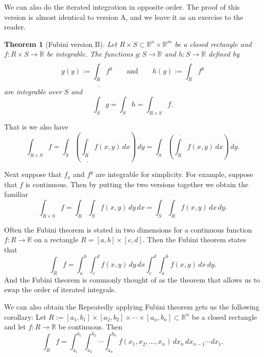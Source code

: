 \documentclass[12pt]{book}
\newcommand{\R}{{\mathbb{R}}}
\theoremstyle{plain}
\newtheorem{thm}{Theorem}[section]
\theoremstyle{remark}
\theoremstyle{definition}
\theoremstyle{exercise}
\theoremstyle{example}
\begin{document}
We can also do the iterated integration in opposite order.
The proof of this version is almost identical to version A, and
we leave it as an exercise to the reader.

\begin{thm}[Fubini version B]\label{mv:fubinivB}
Let $R \times S \subset \R^n \times \R^m$ be a closed rectangle and
$f \colon R \times S \to \R$ be integrable.
The functions $g \colon S \to \R$ and $h \colon S \to \R$ defined by
\begin{equation*}
g(y) := \underline{\int_R} f^y \qquad
\text{and} \qquad
h(y) := \overline{\int_R} f^y 
\end{equation*}
are integrable over $S$ and
\begin{equation*}
\int_S g = \int_S h = \int_{R \times S} f .
\end{equation*}
\end{thm}

That is we also have
\begin{equation*}
\int_{R \times S} f
=
 \int_S \left(
 \underline{\int_R} f(x,y) \, dx
\right) \, dy
=
 \int_S \left(
 \overline{\int_R} f(x,y) \, dx
\right) \, dy .
\end{equation*}

Next suppose that $f_x$ and $f^y$ are integrable for simplicity.
For example, suppose that $f$ is continuous.  Then by
putting the two versions together we obtain the familiar
\begin{equation*}
\int_{R \times S} f
=
 \int_R 
 \int_S f(x,y) \, dy \, dx 
=
 \int_S 
 \int_R f(x,y) \, dx \, dy .
\end{equation*}

Often the Fubini theorem is stated in two dimensions
for a continuous function $f \colon R \to
\R$ on a rectangle $R = [a,b] \times [c,d]$.  Then the Fubini theorem
states that
\begin{equation*}
\int_R f = \int_a^b \int_c^d f(x,y) \,dy\,dx
\int_c^d \int_a^b f(x,y) \,dx\,dy .
\end{equation*}
And the Fubini theorem is commonly thought of as the theorem that allows us
to swap the order of iterated integrals.

We can also obtain the 
Repeatedly applying Fubini theorem gets us the following
corollary:
Let $R := [a_1,b_1] \times [a_2,b_2] \times \cdots \times [a_n,b_n] \subset
\R^n$ be a closed rectangle and let
$f \colon R \to \R$ be continuous.  Then
\begin{equation*}
\int_R f = 
\int_{a_1}^{b_1}
\int_{a_2}^{b_2}
\cdots
\int_{a_n}^{b_n}
f(x_1,x_2,\ldots,x_n)
\,
dx_n
\,
dx_{n-1}
\cdots
dx_1 .
\end{equation*}
\end{document}
